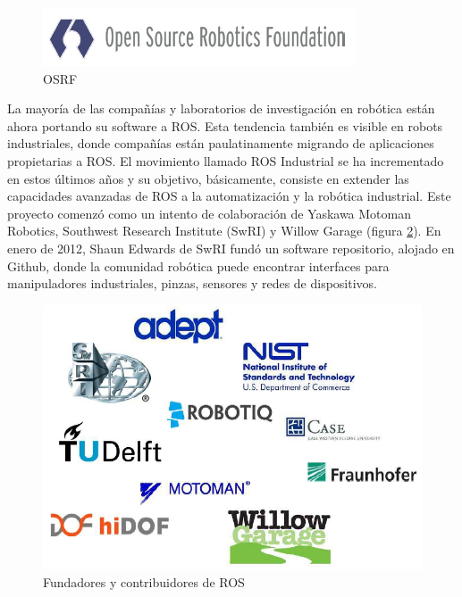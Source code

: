        \begin{figure}[htbp]
            \centering
            \includegraphics[width=0.7\linewidth]{Main/Chapter3/Images3/3-4/entidade-asociadas-al-inicio-de-ros-3.png}
            \caption{OSRF \cite{osrf}} 
            \label{f:Cap3-4_entidades_inicio_ros_334}
        \end{figure}        
        
        \newpage
        
        La mayoría de las compañías y laboratorios de investigación en robótica están ahora portando su software a ROS. Esta tendencia también es visible en robots industriales, donde compañías están paulatinamente migrando de aplicaciones propietarias a ROS. El movimiento llamado ROS Industrial se ha incrementado en estos últimos años y su objetivo, básicamente, consiste en extender las capacidades avanzadas de ROS a la automatización y la robótica industrial. Este proyecto comenzó como un intento de colaboración de Yaskawa Motoman Robotics, Southwest Research Institute (SwRI) y Willow Garage (figura \ref{f:Cap3-4_entidades_inicio_ros_33364}). En enero de 2012, Shaun Edwards de SwRI fundó un software repositorio, alojado en Github, donde la comunidad robótica puede encontrar interfaces para manipuladores industriales, pinzas, sensores y redes de dispositivos.
        
        \begin{figure}[htbp]
            \centering
            \includegraphics[width=0.65\linewidth]{Main/Chapter3/Images3/3-4/entidade-asociadas-al-inicio-de-ros-2.png}
            \caption{Fundadores y contribuidores de ROS} 
            \label{f:Cap3-4_entidades_inicio_ros_33364}
        \end{figure}    
        
